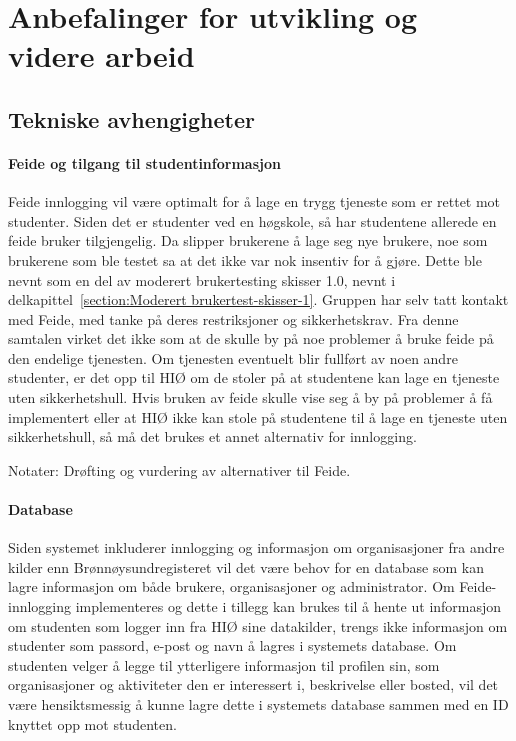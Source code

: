 \section{Anbefalinger for utvikling og videre arbeid}
\label{section:anbefaling-videre-utvikling}

\subsection{Tekniske avhengigheter}

\paragraph{Feide og tilgang til studentinformasjon}
Feide innlogging vil være optimalt for å lage en trygg tjeneste som er rettet mot studenter. Siden det er studenter ved en høgskole, så har studentene allerede en feide bruker tilgjengelig. Da slipper brukerene å lage seg nye brukere, noe som brukerene som ble testet sa at det ikke var nok insentiv for å gjøre. Dette ble nevnt som en del av moderert brukertesting skisser 1.0, nevnt i delkapittel~\ref{section:Moderert brukertest-skisser-1}.
Gruppen har selv tatt kontakt med Feide, med tanke på deres restriksjoner og sikkerhetskrav. Fra denne samtalen virket det ikke som at de skulle by på noe problemer å bruke feide på den endelige tjenesten. Om tjenesten eventuelt blir fullført av noen andre studenter, er det opp til HIØ om de stoler på at studentene kan lage en tjeneste uten sikkerhetshull. \cite{FEIDE-EPOST:24}
Hvis bruken av feide skulle vise seg å by på problemer å få implementert eller at HIØ ikke kan stole på studentene til å lage en tjeneste uten sikkerhetshull, så må det brukes et annet alternativ for innlogging.

Notater:
Drøfting og vurdering av alternativer til Feide.

\paragraph{Database}
Siden systemet inkluderer innlogging og informasjon om organisasjoner fra andre kilder enn Brønnøysundregisteret vil det være behov for en database som kan lagre informasjon om både brukere, organisasjoner og administrator. Om Feide-innlogging implementeres og dette i tillegg kan brukes til å hente ut informasjon om studenten som logger inn fra HIØ sine datakilder, trengs ikke informasjon om studenter som passord, e-post og navn å lagres i systemets database. Om studenten velger å legge til ytterligere informasjon til profilen sin, som organisasjoner og aktiviteter den er interessert i, beskrivelse eller bosted, vil det være hensiktsmessig å kunne lagre dette i systemets database sammen med en ID knyttet opp mot studenten.

